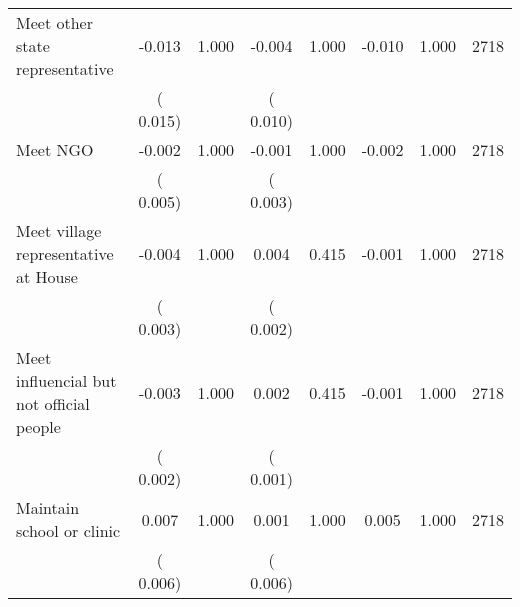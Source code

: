 \begin{tabular}{l*{7}{c}}
 Meet other state representative       &             -0.013       &        1.000  &             -0.004       &        1.000  &             -0.010       &              1.000 &  2718 \\ 
                       &       (       0.015)             &                               &       (       0.010)                     &                               &                                               &                                &                      \\ 

 Meet NGO       &             -0.002       &        1.000  &             -0.001       &        1.000  &             -0.002       &              1.000 &  2718 \\ 
                       &       (       0.005)             &                               &       (       0.003)                     &                               &                                               &                                &                      \\ 

 Meet village representative at House       &             -0.004       &        1.000  &              0.004       &        0.415  &             -0.001       &              1.000 &  2718 \\ 
                       &       (       0.003)             &                               &       (       0.002)                     &                               &                                               &                                &                      \\ 

 Meet influencial but not official people       &             -0.003       &        1.000  &              0.002       &        0.415  &             -0.001       &              1.000 &  2718 \\ 
                       &       (       0.002)             &                               &       (       0.001)                     &                               &                                               &                                &                      \\ 

 Maintain school or clinic       &              0.007       &        1.000  &              0.001       &        1.000  &              0.005       &              1.000 &  2718 \\ 
                       &       (       0.006)             &                               &       (       0.006)                     &                               &                                               &                                &                      \\ 


\end{tabular}
